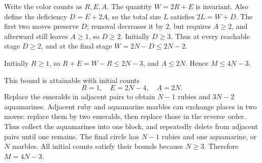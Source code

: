 Write the color counts as $R,E,A$. The quantity $W=2R+E$ is invariant. Also define the deficiency $D=E+2A$, so the total size $L$ satisfies $2L=W+D$. The first two moves preserve $D$; removal decreases it by $2$, but requires $A\ge2$, and afterward still leaves $A\ge1$, so $D\ge2$. Initially $D\ge3$. Thus at every reachable stage $D\ge2$, and at the final stage $W=2N-D\le2N-2$.

Initially $R\ge1$, so $R+E=W-R\le2N-3$, and $A\le2N$. Hence $M\le4N-3$.

This bound is attainable with initial counts
\[
R=1,\quad E=2N-4,\quad A=2N.
\]
Replace the emeralds in adjacent pairs to obtain $N-1$ rubies and $3N-2$ aquamarines. Adjacent ruby and aquamarine marbles can exchange places in two moves: replace them by two emeralds, then replace those in the reverse order. Thus collect the aquamarines into one block, and repeatedly delete from adjacent pairs until one remains. The final circle has $N-1$ rubies and one aquamarine, or $N$ marbles. All initial counts satisfy their bounds because $N\ge3$. Therefore $\boxed{M=4N-3}$.
